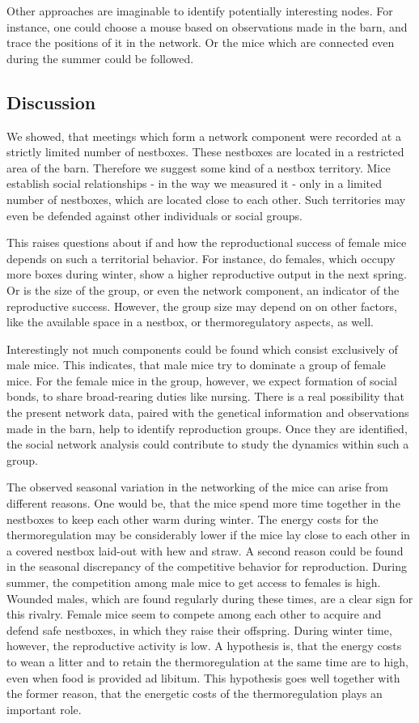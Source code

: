 Other approaches are imaginable to identify potentially interesting nodes. For instance, one could choose a mouse based on observations made in the barn, and trace the positions of it in the network. Or the mice which are connected even during the summer could be followed.

\subsection{Discussion}
\label{subsec:discussion}

We showed, that meetings which form a network component were recorded at a strictly limited number of nestboxes. These nestboxes are located in a restricted area of the barn. Therefore we suggest some kind of a nestbox territory. Mice establish social relationships - in the way we measured it - only in a limited number of nestboxes, which are located close to each other. Such territories may even be defended against other individuals or social groups.

This raises questions about if and how the reproductional success of female mice depends on such a territorial behavior. For instance, do females, which occupy more boxes during winter, show a higher reproductive output in the next spring. Or is the size of the group, or even the network component, an indicator of the reproductive success. However, the group size may depend on on other factors, like the available space in a nestbox, or thermoregulatory aspects, as well.

Interestingly not much components could be found which consist exclusively of male mice. This indicates, that male mice try to dominate a group of female mice. For the female mice in the group, however, we expect formation of social bonds, to share broad-rearing duties like nursing. There is a real possibility that the present network data, paired with the genetical information and observations made in the barn, help to identify reproduction groups. Once they are identified, the social network analysis could contribute to study the dynamics within such a group.     

The observed seasonal variation in the networking of the mice can arise from different reasons. One would be, that the mice spend more time together in the nestboxes to keep each other warm during winter. The energy costs for the thermoregulation may be considerably lower if the mice lay close to each other in a covered nestbox laid-out with hew and straw. A second reason could be found in the seasonal discrepancy of the competitive behavior for reproduction. During summer, the competition among male mice to get access to females is high. Wounded males, which are found regularly during these times, are a clear sign for this rivalry. Female mice seem to compete among each other to acquire and defend safe nestboxes, in which they raise their offspring. During winter time, however, the reproductive activity is low. A hypothesis is, that the energy costs to wean a litter and to retain the thermoregulation at the same time are to high, even when food is provided ad libitum. This hypothesis goes well together with the former reason, that the energetic costs of the thermoregulation plays an important role.    

